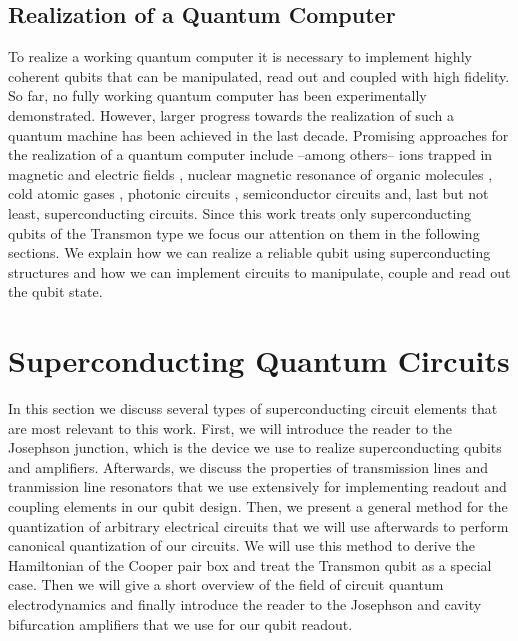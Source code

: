 \subsection{Realization of a Quantum Computer}

To realize a working quantum computer it is necessary to implement highly coherent qubits that can be manipulated, read out and coupled with high fidelity. So far, no fully working quantum computer has been experimentally demonstrated. However, larger progress towards the realization of such a quantum machine has been achieved in the last decade. Promising approaches for the realization of a quantum computer include --among others-- ions trapped in magnetic and electric fields \citep{monroe_demonstration_1995,cirac_quantum_1995}, nuclear magnetic resonance of organic molecules \citep{jones_nmr_2001,vandersypen_experimental_2001}, cold atomic gases \citep{briegel_quantum_2000}, photonic circuits \citep{knill_scheme_2001}, semiconductor circuits \citep{loss_quantum_1998} and, last but not least, superconducting circuits. Since this work treats only superconducting qubits of the Transmon type we focus our attention on them in the following sections. We explain how we can realize a reliable qubit using superconducting structures and how we can implement circuits to manipulate, couple and read out the qubit state.

\section{Superconducting Quantum Circuits}

In this section we discuss several types of superconducting circuit elements that are most relevant to this work. First, we will introduce the reader to the Josephson junction, which is the device we use to realize superconducting qubits and amplifiers. Afterwards, we discuss the properties of transmission lines and tranmission line resonators that we use extensively for implementing readout and coupling elements in our qubit design. Then, we present a general method for the quantization of arbitrary electrical circuits that we will use afterwards to perform canonical quantization of our circuits. We will use this method to derive the Hamiltonian of the Cooper pair box and treat the Transmon qubit as a special case. Then we will give a short overview of the field of circuit quantum electrodynamics and finally introduce the reader to the Josephson and cavity bifurcation amplifiers that we use for our qubit readout.

